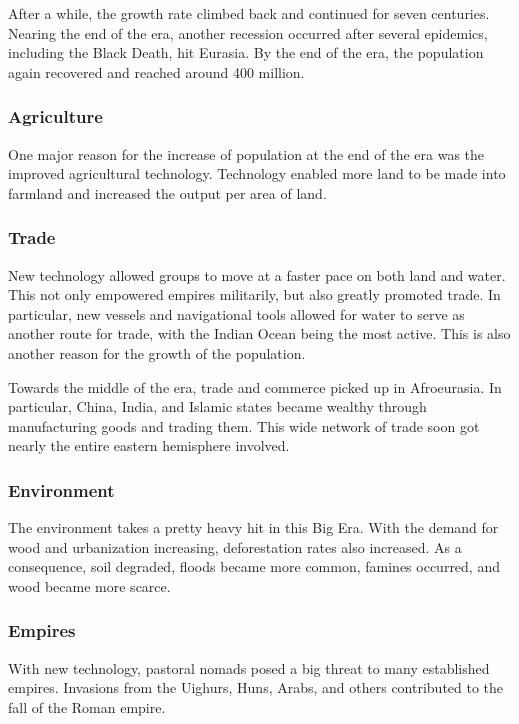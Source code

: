 \documentclass[11pt]{article}
\begin{document}
After a while, the growth rate climbed back and continued for seven centuries. Nearing the end of the era, another recession occurred after several epidemics, including the Black Death, hit Eurasia. By the end of the era, the population again recovered and reached around 400 million.

\subsubsection{Agriculture}
\label{sec:org2cab768}

One major reason for the increase of population at the end of the era was the improved agricultural technology. Technology enabled more land to be made into farmland and increased the output per area of land.

\subsubsection{Trade}
\label{sec:org7818f65}

New technology allowed groups to move at a faster pace on both land and water. This not only empowered empires militarily, but also greatly promoted trade. In particular, new vessels and navigational tools allowed for water to serve as another route for trade, with the Indian Ocean being the most active. This is also another reason for the growth of the population.

Towards the middle of the era, trade and commerce picked up in Afroeurasia. In particular, China, India, and Islamic states became wealthy through manufacturing goods and trading them. This wide network of trade soon got nearly the entire eastern hemisphere involved.

\subsubsection{Environment}
\label{sec:org5ae7288}

The environment takes a pretty heavy hit in this Big Era. With the demand for wood and urbanization increasing, deforestation rates also increased. As a consequence, soil degraded, floods became more common, famines occurred, and wood became more scarce.

\subsubsection{Empires}
\label{sec:org42e8c5c}

With new technology, pastoral nomads posed a big threat to many established empires. Invasions from the Uighurs, Huns, Arabs, and others contributed to the fall of the Roman empire.
\end{document}
